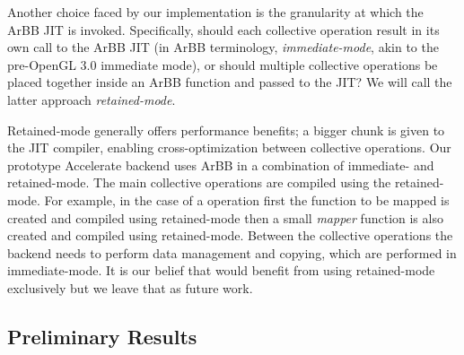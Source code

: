 

Another choice faced by our implementation is the granularity at which the
ArBB JIT is invoked.  Specifically, should each collective operation result in its
own call to the ArBB JIT (in ArBB terminology, {\em
  immediate-mode}, akin to the pre-OpenGL 3.0 immediate mode), or
should multiple collective operations be placed together
inside an ArBB function and passed to the JIT?
We will call the latter approach {\em retained-mode}.


Retained-mode generally offers performance benefits; a bigger 
chunk is given to the JIT compiler, enabling cross-optimization
between collective operations. 
Our prototype Accelerate backend uses 
ArBB in  
a combination of immediate- and retained-mode. The main collective 
operations are compiled using the retained-mode. For example, in the case 
of a   operation first the function to be mapped is created and 
compiled using retained-mode then a small {\em mapper} function is 
also created and compiled using retained-mode. 
Between the collective operations the backend
needs to perform data management and copying, which 
are performed in immediate-mode. It is our belief that 
\systemname{} would benefit from using retained-mode exclusively 
but we leave that as future work. 





\subsection{Preliminary Results}

